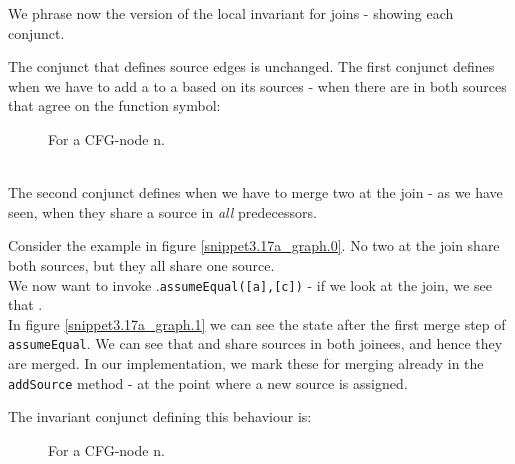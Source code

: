 \bigskip
\noindent
We phrase now the version of the local invariant for joins - showing each conjunct.

The conjunct that defines source edges is unchanged.
The first conjunct defines when we have to add a \GFA{} to a \GT{} based on its sources - when there are \GFAs{} in both sources that agree on the function symbol:
\begin{figure}[H]
For a CFG-node n.\\
\\
\end{figure}

\noindent
The second conjunct defines when we have to merge two \GTs{} at the join - as we have seen, when they share a source in \emph{all} predecessors.

\noindent
Consider the example in figure \ref{snippet3.17a_graph.0}.
No two \GTs{} at the join share both sources, but they all share one source.\\
We now want to invoke .\lstinline|assumeEqual([a],[c])| - if we look at the join, we see that .\\
 In figure \ref{snippet3.17a_graph.1} we can see the state after the first merge step of \lstinline|assumeEqual|.
We can see that  and  share sources in both joinees, and hence they are merged.
In our implementation, we mark these \GTs{} for merging already in the 
\lstinline|addSource| method - at the point where a new source is assigned.

\noindent
The invariant conjunct defining this behaviour is:
\begin{figure}[H]
For a CFG-node n.\\
\\
\end{figure}


